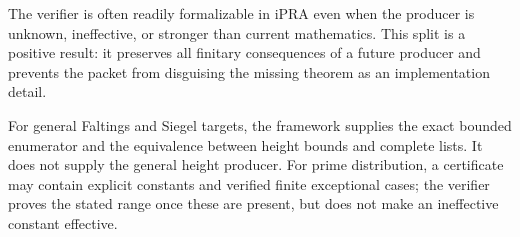 The verifier is often readily formalizable in iPRA even when the producer is
unknown, ineffective, or stronger than current mathematics.  This split is a
positive result: it preserves all finitary consequences of a future producer
and prevents the packet from disguising the missing theorem as an
implementation detail.

For general Faltings and Siegel targets, the framework supplies the exact
bounded enumerator and the equivalence between height bounds and complete
lists.  It does not supply the general height producer.  For prime
distribution, a certificate may contain explicit constants and verified
finite exceptional cases; the verifier proves the stated range once these are
present, but does not make an ineffective constant effective.
